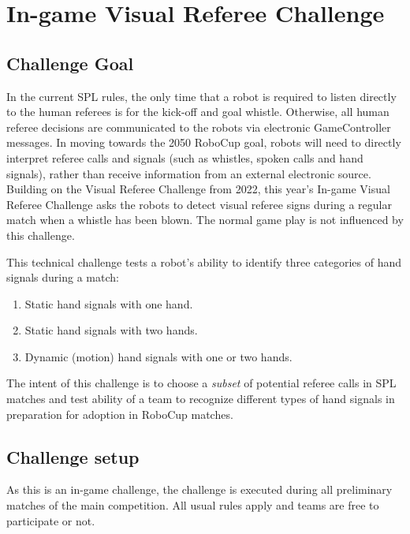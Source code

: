 \section{In-game Visual Referee Challenge}

\subsection{Challenge Goal}

In the current SPL rules, the only time that a robot is required to listen directly to the human referees is for the kick-off and goal whistle. Otherwise, all human referee decisions are communicated to the robots via electronic GameController messages. In moving towards the 2050 RoboCup goal, robots will need to directly interpret referee calls and signals (such as whistles, spoken calls and hand signals), rather than receive information from an external electronic source.
Building on the Visual Referee Challenge from 2022, this year's In-game Visual Referee Challenge asks the robots to detect visual referee signs during a regular match when a whistle has been blown. The normal game play is not influenced by this challenge.

This technical challenge tests a robot's ability to identify three categories of hand signals during a match:
\begin{enumerate}
    \item Static hand signals with one hand.
    \item Static hand signals with two hands.
    \item Dynamic (motion) hand signals with one or two hands.
\end{enumerate}

The intent of this challenge is to choose a \emph{subset} of potential referee calls in SPL matches and test ability of a team to recognize different types of hand signals in preparation for adoption in RoboCup matches.

\subsection{Challenge setup}

As this is an in-game challenge, the challenge is executed during all preliminary matches of the main competition. All usual rules apply and teams are free to participate or not.

